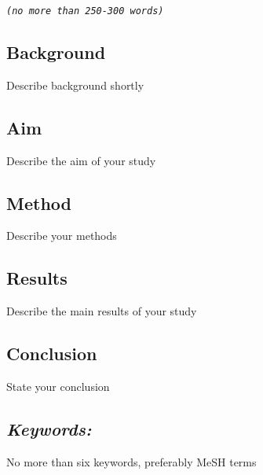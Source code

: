 \thispagestyle{empty}

\textit{\texttt{(no more than 250-300 words)}}

\subsection*{Background}
Describe background shortly

\subsection*{Aim}
Describe the aim of your study

\subsection*{Method}
Describe your methods

\subsection*{Results}
Describe the main results of your study

\subsection*{Conclusion}
State your conclusion

\subsection*{\emph{Keywords:}} No more than six keywords, preferably MeSH terms